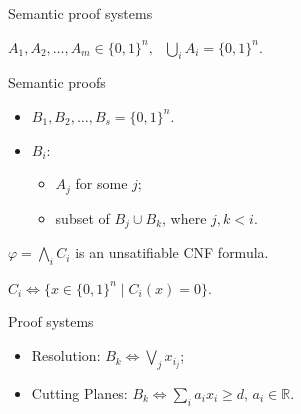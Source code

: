 \begin{frame}{Semantic proof systems}

    \pause
    $A_1, A_2, \dots, A_m \in \{0, 1\}^n, ~~~ \bigcup\limits_{i} A_i = \{0, 1\}^n$.

    \pause

    \begin{block}{Semantic proofs}
        \begin{itemize}
            \item $B_1, B_2, \dots, B_s = \{0, 1\}^n$.
            \item $B_i$:
                \begin{itemize}
                    \item $A_j$ for some $j$;
                    \item subset of $B_j \cup B_k$, where $j, k < i$.
                \end{itemize}
                
        \end{itemize}
    \end{block}

    \pause

    
    $\varphi = \bigwedge\limits_{i} C_i$ is an unsatifiable CNF formula.

    $C_i \Leftrightarrow \{x \in \{0, 1\}^n \mid C_i(x) = 0\}$.

    \pause

    \begin{block}{Proof systems}
        \begin{itemize}
            \item Resolution: $B_k \Leftrightarrow \bigvee\limits_{j} x_{i_j}$;
            \item Cutting Planes: $B_k \Leftrightarrow \sum\limits_{i} a_i x_{i} \ge d$, $a_i \in \mathbb{R}$.
        \end{itemize}
    \end{block}
\end{frame}